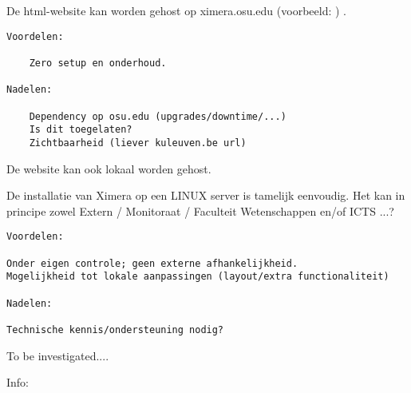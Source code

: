 \documentclass{ximera}
\begin{document}
De html-website kan worden gehost op ximera.osu.edu  (voorbeeld: ) . 

\begin{verbatim}
Voordelen:

    Zero setup en onderhoud.

Nadelen:

    Dependency op osu.edu (upgrades/downtime/...)
    Is dit toegelaten?
    Zichtbaarheid (liever kuleuven.be url)

\end{verbatim}

De website kan ook lokaal worden gehost.

De installatie van Ximera op een LINUX server is tamelijk eenvoudig. Het kan in principe zowel Extern / Monitoraat / Faculteit Wetenschappen en/of ICTS ...? 

\begin{verbatim}
Voordelen:

Onder eigen controle; geen externe afhankelijkheid.
Mogelijkheid tot lokale aanpassingen (layout/extra functionaliteit)

Nadelen:

Technische kennis/ondersteuning nodig?

\end{verbatim}

To be investigated....
    
Info: 
\end{document}
